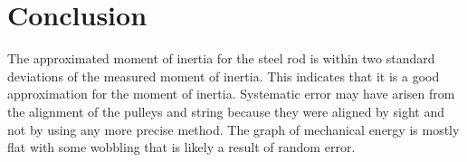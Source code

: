 \documentclass[12pt]{article}
\begin{document}
    \section{Conclusion}
        The approximated moment of inertia for the steel rod is within two standard deviations of the measured moment of inertia. This indicates that it is a good approximation for the moment of inertia. Systematic error may have arisen from the alignment of the pulleys and string because they were aligned by sight and not by using any more precise method. The graph of mechanical energy is mostly flat with some wobbling that is likely a result of random error.
\end{document}
